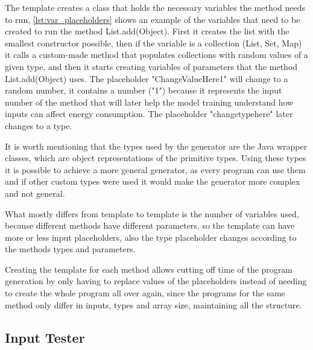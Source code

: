 The template creates a class that holds the necessary variables the method needs to run, \ref{lst:var_placeholders} shows an example of the variables that need to be created to run the method List.add(Object). First it creates the list with the smallest constructor possible, then if the variable is a collection (List, Set, Map) it calls a custom-made method that populates collections with random values of a given type, and then it starts creating variables of parameters that the method List.add(Object) uses. The placeholder "ChangeValueHere1" will change to a random number, it contains a number ("1") because it represents the input number of the method that will later help the model training understand how inputs can affect energy consumption. The placeholder "changetypehere" later changes to a type.

It is worth mentioning that the types used by the generator are the Java wrapper classes, which are object representations of the primitive types. Using these types it is possible to achieve a more general generator, as every program can use them and if other custom types were used it would make the generator more complex and not general.

What mostly differs from template to template is the number of variables used, because different methods have different parameters, so the template can have more or less input placeholders, also the type placeholder changes according to the methods types and parameters.


Creating the template for each method allows cutting off time of the program generation by only having to replace values of the placeholders instead of needing to create the whole program all over again, since the programs for the same method only differ in inputs, types and array size, maintaining all the structure.

\subsection{Input Tester} \label{sec:work_stage1_input_tester}

